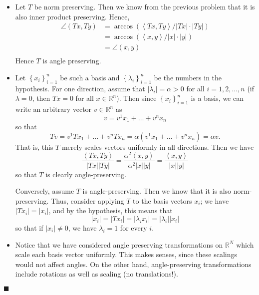 \documentclass[12pt]{article}
\renewcommand{\qed}{\hfill$\blacksquare$}
\renewenvironment{proof}{\begin{addmargin}[1em]{0em}\begin{newproof}}{\end{newproof}\end{addmargin}\qed}
\begin{document}
\begin{proof}

\begin{itemize}
	\item Let $T$ be norm preserving. Then we know from the previous problem that it is also inner product preserving. Hence,
	\begin{equation*}
	\begin{split}
	\angle \left( Tx,Ty\right) & = \arccos \left( \left\langle Tx,Ty \right\rangle / \left|Tx\right| \cdot \left| Ty \right| \right) \\ 
	& = \arccos \left( \left\langle x, y\right\rangle / \left|x\right| \cdot \left| y\right| \right) \\
	& = \angle \left(x,y\right) \\
	\end{split}
	\end{equation*}
Hence $T$ is angle preserving. \\
	\item Let $\left\{ x_i \right\}_{i=1}^n$ be such a basis and $\left\{ \lambda_i \right\}_{i=1}^n$ be the numbers in the hypothesis. For one direction, assume that $\left|\lambda_i\right| = \alpha > 0$ for all $i=1,2,\ldots,n$ (if $\lambda = 0$, then $Tx = 0$ for all $x\in\mathbb{R}^n$). Then since $\left\{x_i\right\}_{i=1}^n$ is a basis, we can write an arbitrary vector $v\in \mathbb{R}^n$ as $$ v = v^1 x_1 + \ldots + v^n x_n $$ so that $$ Tv = v^1 Tx_1 + \ldots + v^n Tx_n = \alpha \left(v^1 x_1 + \ldots + v^n x_n\right) = \alpha v. $$ That is, this $T$ merely scales vectors uniformly in all directions. Then we have $$ \frac{\left\langle Tx, Ty \right\rangle }{\left|Tx\right| \left|Ty\right|} = \frac{\alpha^2 \left\langle x, y\right\rangle}{\alpha^2 \left|x\right|\left|y\right|} = \frac{\left\langle x, y\right\rangle}{\left|x\right|\left|y\right|}  $$ so that $T$ is clearly angle-preserving.
	
	Conversely, assume $T$ is angle-preserving. Then we know that it is also norm-preserving. Thus, consider applying $T$ to the basis vectors $x_i$; we have $\left|Tx_i\right| = \left|x_i\right|$, and by the hypothesis, this means that $$\left|x_i\right| = \left|Tx_i\right| = \left|\lambda_i x_i\right| = \left|\lambda_i\right| \left|x_i\right| $$ so that if $\left|x_i\right| \neq 0$, we have $\lambda_i = 1$ for every $i$. \\
	\item Notice that we have considered angle preserving transformations on $\mathbb{R}^N$ which scale each basis vector uniformly. This makes senses, since these scalings would not affect angles. On the other hand, angle-preserving transformations include rotations as well as scaling (no translations!).
\end{itemize}

\end{proof}
\end{document}
